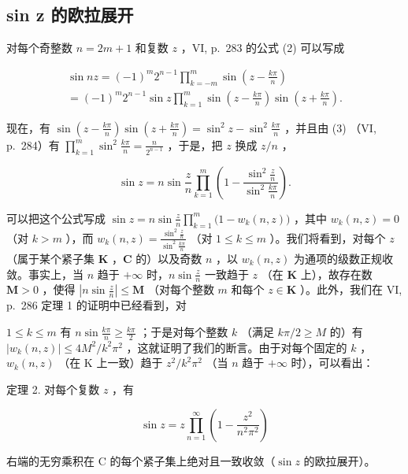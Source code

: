 \subsection{sin z 的欧拉展开}

对每个奇整数 \(n = 2m + 1\) 和复数 \(z\) ，VI, p.~283 的公式 (2) 可以写成

\[
\begin{array}{l} \sin n z = (- 1) ^ {m}   2 ^ {n - 1}   \prod_ {k = - m} ^ {m}   \sin \left(z - \frac {k \pi}{n}\right) \\ = (- 1) ^ {m}   2 ^ {n - 1}   \sin z   \prod_ {k = 1} ^ {m}   \sin \left(z - \frac {k \pi}{n}\right) \sin \left(z + \frac {k \pi}{n}\right). \end{array}
\]

现在，有 \(\sin\left(z-\frac{k\pi}{n}\right)\sin\left(z+\frac{k\pi}{n}\right)=\sin^{2}z-\sin^{2}\frac{k\pi}{n}\) ，并且由 (3) （VI, p.~284）有 \(\prod_{k=1}^{m}\sin^{2}\frac{k\pi}{n}=\frac{n}{2^{n-1}}\) ，于是，把 \(z\) 换成 \(z/n\) ，

\[
\sin z = n \sin \frac {z}{n} \prod_ {k = 1} ^ {m} \left(1 - \frac {\sin^ {2} \frac {z}{n}}{\sin^ {2} \frac {k \pi}{n}}\right).\tag{9}
\]

可以把这个公式写成 \(\sin z = n\sin \frac{z}{n}\prod_{k = 1}^{m}\big(1 - w_k(n,z)\big)\) ，其中 \(w_{k}(n,z) = 0\) （对 \(k > m\) ），而 \(w_{k}(n,z) = \frac{\sin^{2}\frac{z}{n}}{\sin^{2}\frac{k\pi}{n}}\) （对 \(1\leqslant k\leqslant m\) ）。我们将看到，对每个 \(z\) （属于某个紧子集 \(\mathbf{K}\) ，\(\mathbf{C}\) 的）以及奇数 \(n\) ，以 \(w_{k}(n,z)\) 为通项的级数正规收敛。事实上，当 \(n\) 趋于 \(+\infty\) 时，\(n\sin \frac{z}{n}\) 一致趋于 \(z\) （在 \(\mathbf{K}\) 上），故存在数 \(\mathbf{M} > 0\) ，使得 \(\left|n\sin \frac{z}{n}\right|\leqslant \mathbf{M}\) （对每个整数 \(m\) 和每个 \(z\in \mathbf{K}\) ）。此外，我们在 VI, p.~286 定理 1 的证明中已经看到，对

\(1 \leqslant k \leqslant m\) 有 \(n \sin \frac{k\pi}{n} \geqslant \frac{k\pi}{2}\) ；于是对每个整数 \(k\) （满足 \(k\pi/2 \geqslant M\) 的）有 \(|w_k(n, z)| \leqslant 4M^2/k^2\pi^2\) ，这就证明了我们的断言。由于对每个固定的 \(k\) ，\(w_k(n, z)\) （在 K 上一致）趋于 \(z^2/k^2\pi^2\) （当 \(n\) 趋于 \(+\infty\) 时），可以看出：

定理 2. 对每个复数 \(z\) ，有

\[
\sin z = z \prod_ {n = 1} ^ {\infty} \left(1 - \frac {z ^ {2}}{n ^ {2} \pi^ {2}}\right)\tag{10}
\]

右端的无穷乘积在 C 的每个紧子集上绝对且一致收敛（\(\sin z\) 的欧拉展开）。

